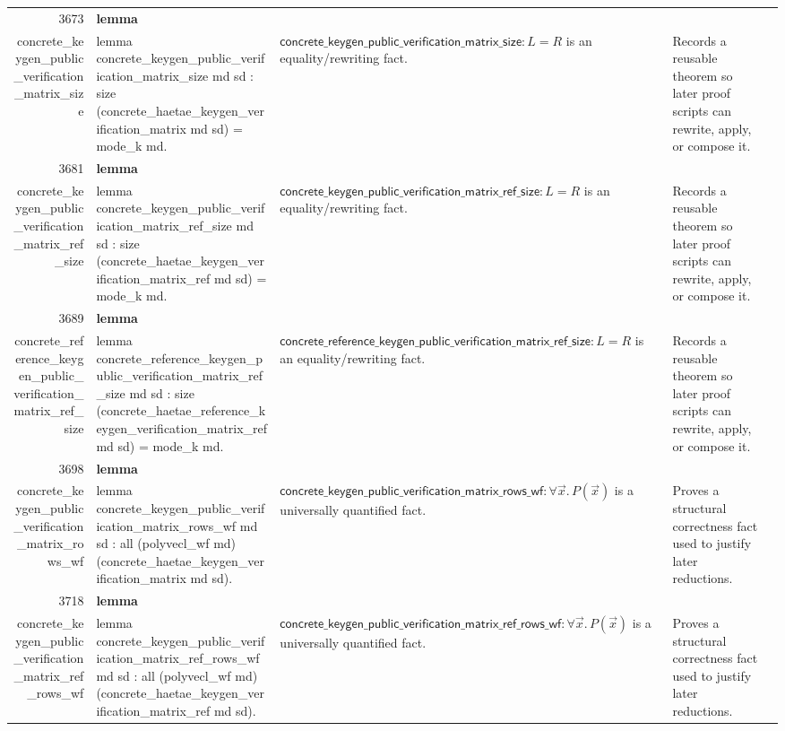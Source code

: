 \documentclass[10pt]{article}
\newcommand{\ec}[1]{\begingroup\ttfamily\scriptsize #1\endgroup}
\begin{document}
\begin{longtable}{r L{0.17\textwidth} L{0.26\textwidth} L{0.27\textwidth} L{0.20\textwidth}}
3673 & \textbf{lemma}\\\ec{concrete\_keygen\_public\_verification\_matrix\_size} & \ec{lemma concrete\_keygen\_public\_verification\_matrix\_size md sd : size (concrete\_haetae\_keygen\_verification\_matrix md sd) = mode\_k md.} & \(\mathsf{concrete\_keygen\_public\_verification\_matrix\_size} : L = R\) is an equality/rewriting fact. & Records a reusable theorem so later proof scripts can rewrite, apply, or compose it. \\
3681 & \textbf{lemma}\\\ec{concrete\_keygen\_public\_verification\_matrix\_ref\_size} & \ec{lemma concrete\_keygen\_public\_verification\_matrix\_ref\_size md sd : size (concrete\_haetae\_keygen\_verification\_matrix\_ref md sd) = mode\_k md.} & \(\mathsf{concrete\_keygen\_public\_verification\_matrix\_ref\_size} : L = R\) is an equality/rewriting fact. & Records a reusable theorem so later proof scripts can rewrite, apply, or compose it. \\
3689 & \textbf{lemma}\\\ec{concrete\_reference\_keygen\_public\_verification\_matrix\_ref\_size} & \ec{lemma concrete\_reference\_keygen\_public\_verification\_matrix\_ref\_size md sd : size (concrete\_haetae\_reference\_keygen\_verification\_matrix\_ref md sd) = mode\_k md.} & \(\mathsf{concrete\_reference\_keygen\_public\_verification\_matrix\_ref\_size} : L = R\) is an equality/rewriting fact. & Records a reusable theorem so later proof scripts can rewrite, apply, or compose it. \\
3698 & \textbf{lemma}\\\ec{concrete\_keygen\_public\_verification\_matrix\_rows\_wf} & \ec{lemma concrete\_keygen\_public\_verification\_matrix\_rows\_wf md sd : all (polyvecl\_wf md) (concrete\_haetae\_keygen\_verification\_matrix md sd).} & \(\mathsf{concrete\_keygen\_public\_verification\_matrix\_rows\_wf} : \forall \vec{x}.\, P(\vec{x})\) is a universally quantified fact. & Proves a structural correctness fact used to justify later reductions. \\
3718 & \textbf{lemma}\\\ec{concrete\_keygen\_public\_verification\_matrix\_ref\_rows\_wf} & \ec{lemma concrete\_keygen\_public\_verification\_matrix\_ref\_rows\_wf md sd : all (polyvecl\_wf md) (concrete\_haetae\_keygen\_verification\_matrix\_ref md sd).} & \(\mathsf{concrete\_keygen\_public\_verification\_matrix\_ref\_rows\_wf} : \forall \vec{x}.\, P(\vec{x})\) is a universally quantified fact. & Proves a structural correctness fact used to justify later reductions. \\

\end{longtable}
\end{document}

